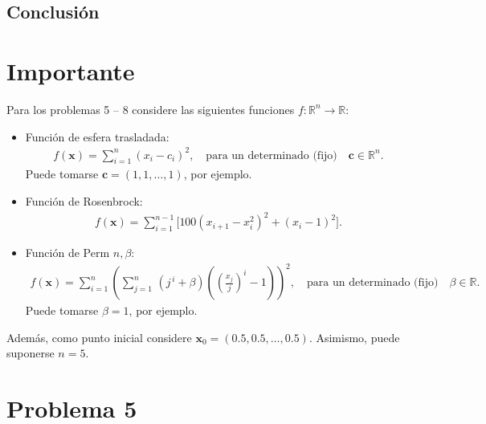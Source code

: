 \documentclass{article}
\begin{document}
\subsection{Conclusión}

\section*{Importante}
\setcounter{equation}{0}
Para los problemas 5 -- 8 considere las siguientes funciones $f : \mathbb{R}^n \rightarrow \mathbb{R}$:

\begin{itemize}
    \item Función de esfera trasladada:\\
    \begin{align}
        f(\mathbf{x}) = \sum_{i=1}^{n} (x_i - c_i)^2, \quad \text{para un determinado (fijo)} \quad \mathbf{c} \in \mathbb{R}^n.
    \end{align}
    Puede tomarse $\mathbf{c} = (1,1,\dots,1)$, por ejemplo.

    \item Función de Rosenbrock:\\
    \begin{align}
        f(\mathbf{x}) = \sum_{i=1}^{n-1} \Big[ 100(x_{i+1} - x_i^{2})^{2} + (x_i - 1)^{2} \Big].
    \end{align}

    \item Función de Perm $n,\beta$:\\
    \begin{align}
        f(\mathbf{x}) =
        \sum_{i=1}^{n} \left(
            \sum_{j=1}^{n}\,(j^{\,i} + \beta)\left( \left(\frac{x_j}{j}\right)^{i} - 1 \right)
        \right)^{2}, \quad \text{para un determinado (fijo)} \quad \beta \in \mathbb{R}.
    \end{align}
    Puede tomarse $\beta = 1$, por ejemplo.
\end{itemize}
Además, como punto inicial considere $\mathbf{x}_0 = (0.5,0.5,\dots,0.5)$. Asimismo, puede suponerse $n=5$.

\section{Problema 5}
\end{document}

